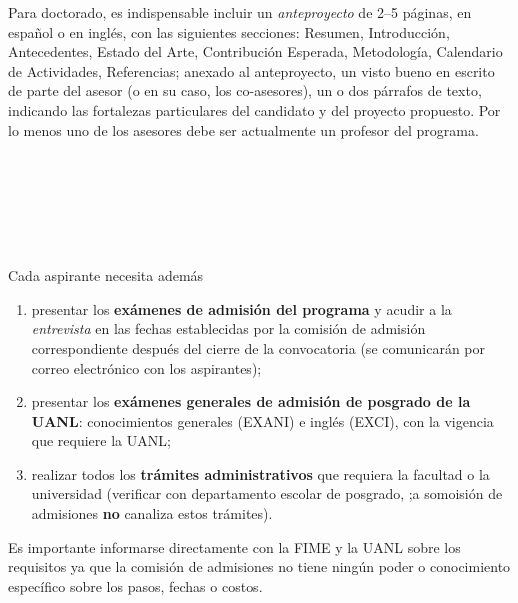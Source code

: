 \documentclass{article}
\begin{document}
\begin{Form}
Para doctorado, es indispensable incluir un {\em anteproyecto} de 2--5
páginas, en español o en inglés, con las siguientes secciones:
Resumen, Introducción, Antecedentes, Estado del Arte, Contribución
Esperada, Metodología, Calendario de Actividades, Referencias; anexado
al anteproyecto, un visto bueno en escrito de parte del asesor (o en
su caso, los co-asesores), un o dos párrafos de texto, indicando las
fortalezas particulares del candidato y del proyecto propuesto. Por lo
menos uno de los asesores debe ser actualmente un profesor del
programa.

\begin{flushright}
 \\
 \\
 \\
 \\
 \\
\end{flushright}


Cada aspirante necesita además
\begin{enumerate}
\item presentar los {\bf exámenes de admisión del programa} y acudir a la
  {\em entrevista} en las fechas establecidas por la comisión de admisión
  correspondiente después del cierre de la convocatoria (se
  comunicarán por correo electrónico con los aspirantes);
\item presentar los {\bf exámenes generales de admisión de posgrado de
  la UANL}: conocimientos generales (EXANI) e inglés (EXCI), con la
  vigencia que requiere la UANL;
\item realizar todos los {\bf trámites administrativos} que requiera
  la facultad o la universidad (verificar con departamento escolar de
  posgrado, ;a somoisión de admisiones {\bf no} canaliza estos
  trámites).
\end{enumerate}
Es importante informarse directamente con la FIME y la UANL sobre los
requisitos ya que la comisión de admisiones no tiene ningún poder o
conocimiento específico sobre los pasos, fechas o costos.

\end{Form}
\end{document}
